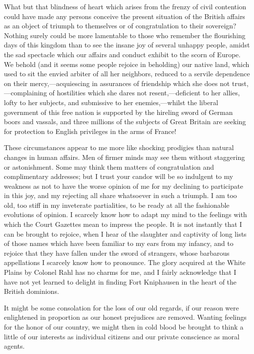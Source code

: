 What but that blindness of heart which arises from the frenzy of civil contention could have made any persons conceive the present situation of the British affairs as an object of triumph to themselves or of congratulation to their sovereign? Nothing surely could be more lamentable to those who remember the flourishing days of this kingdom than to see the insane joy of several unhappy people, amidst the sad spectacle which our affairs and conduct exhibit to the scorn of Europe. We behold (and it seems some people rejoice in beholding) our native land, which used to sit the envied arbiter of all her neighbors, reduced to a servile dependence on their mercy,—acquiescing in assurances of friendship which she does not trust,—complaining of hostilities which she dares not resent,—deficient to her allies, lofty to her subjects, and submissive to her enemies,—whilst the liberal government of this free nation is supported by the hireling sword of German boors and vassals, and three millions of the subjects of Great Britain are seeking for protection to English privileges in the arms of France!

These circumstances appear to me more like shocking prodigies than natural changes in human affairs. Men of firmer minds may see them without staggering or astonishment. Some may think them matters of congratulation and complimentary addresses; but I trust your candor will be so indulgent to my weakness as not to have the worse opinion of me for my declining to participate in this joy, and my rejecting all share whatsoever in such a triumph. I am too old, too stiff in my inveterate partialities, to be ready at all the fashionable evolutions of opinion. I scarcely know how to adapt my mind to the feelings with which the Court Gazettes mean to impress the people. It is not instantly that I can be brought to rejoice, when I hear of the slaughter and captivity of long lists of those names which have been familiar to my ears from my infancy, and to rejoice that they have fallen under the sword of strangers, whose barbarous appellations I scarcely know how to pronounce. The glory acquired at the White Plains by Colonel Rahl has no charms for me, and I fairly acknowledge that I have not yet learned to delight in finding Fort Kniphausen in the heart of the British dominions.

It might be some consolation for the loss of our old regards, if our reason were enlightened in proportion as our honest prejudices are removed. Wanting feelings for the honor of our country, we might then in cold blood be brought to think a little of our interests as individual citizens and our private conscience as moral agents.

